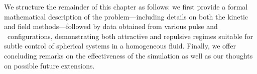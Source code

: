 We structure the remainder of this chapter as follows: we first provide a formal mathematical description of the problem---including details on both the kinetic and field methods---followed by data obtained from various pulse and \bubble\ configurations, demonstrating both attractive and repulsive regimes suitable for subtle control of spherical systems in a homogeneous fluid.
Finally, we offer concluding remarks on the effectiveness of the simulation as well as our thoughts on possible future extensions.
